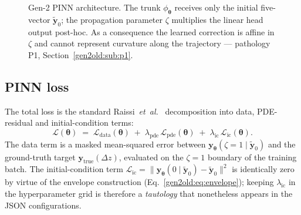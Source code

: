 \documentclass[a4paper,11pt]{article}
\newcommand{\dz}{\Delta z}
\newcommand{\state}{\mathbf{y}}
\newcommand{\loss}{\mathcal{L}}
\newcommand{\btheta}{\bm{\theta}}
\begin{document}
\begin{figure}[!htbp]
\centering
{}
\caption{Gen-2 PINN architecture. The trunk $\phi_{\bm\theta}$ receives only
the initial five-vector $\tilde{\state}_0$; the propagation parameter
$\zeta$ multiplies the linear head output post-hoc. As a consequence the
learned correction is affine in $\zeta$ and cannot represent curvature
along the trajectory --- pathology P1,
Section~\ref{gen2old:sub:p1}.}
\label{gen2old:fig:pinn_arch}
\end{figure}

\subsection{PINN loss}\label{gen2old:sub:pinn_loss}

The total loss is the standard Raissi~\textit{et~al.}~\cite{raissi2019}
decomposition into data, PDE-residual and initial-condition terms:
\begin{equation}\label{gen2old:eq:pinn_loss}
  \loss(\btheta)
  \;=\;
  \loss_{\mathrm{data}}(\btheta)
  \;+\;
  \lambda_{\mathrm{pde}}\,\loss_{\mathrm{pde}}(\btheta)
  \;+\;
  \lambda_{\mathrm{ic}}\,\loss_{\mathrm{ic}}(\btheta).
\end{equation}
The data term is a masked mean-squared error between
$\state_{\btheta}(\zeta{=}1\mid\tilde{\state}_0)$ and the ground-truth
target $\state_{\mathrm{true}}(\dz)$, evaluated on the $\zeta{=}1$ boundary
of the training batch. The initial-condition term
$\loss_{\mathrm{ic}} = \|\state_{\btheta}(0\mid\tilde{\state}_0) -
\tilde{\state}_0\|^2$ is identically zero by virtue of the envelope
construction (Eq.~\ref{gen2old:eq:envelope}); keeping $\lambda_{\mathrm{ic}}$
in the hyperparameter grid is therefore a \emph{tautology} that nonetheless
appears in the JSON configurations.
\end{document}
